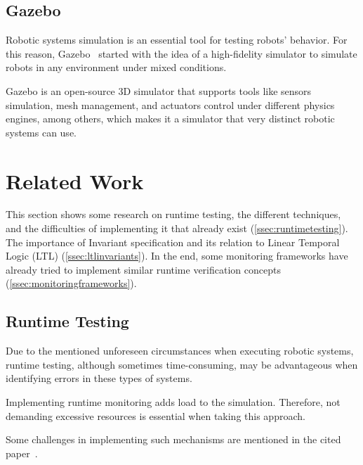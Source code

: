 \subsection{Gazebo}
\label{ssec:gazebo}

Robotic systems simulation is an essential tool for testing robots' behavior. For this reason, Gazebo~\cite{koenig2004design} started with the idea of a high-fidelity simulator to simulate robots in any environment under mixed conditions.

Gazebo is an open-source 3D simulator that supports tools like sensors simulation, mesh management, and actuators control under different physics engines, among others, which makes it a simulator that very distinct robotic systems can use.


\section{Related Work}
\label{sec:relatedwork}

This section shows some research on runtime testing, the different techniques, and the difficulties of implementing it that already exist (\autoref{ssec:runtimetesting}). The importance of Invariant specification and its relation to Linear Temporal Logic (LTL) (\autoref{ssec:ltlinvariants}). In the end, some monitoring frameworks have already tried to implement similar runtime verification concepts (\autoref{ssec:monitoringframeworks}).


\subsection{Runtime Testing}
\label{ssec:runtimetesting}

Due to the mentioned unforeseen circumstances when executing robotic systems, runtime testing, although sometimes time-consuming, may be advantageous when identifying errors in these types of systems.

Implementing runtime monitoring adds load to the simulation. Therefore, not demanding excessive resources is essential when taking this approach.

Some challenges in implementing such mechanisms are mentioned in the cited paper~\cite{stadler2022towards}.


